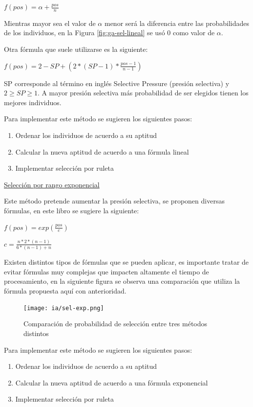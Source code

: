 \documentclass[11pt,fleqn]{book} %
\begin{document}
$f(pos) = \alpha + \frac{pos}{n}$

Mientras mayor sea el valor de $\alpha$ menor será la diferencia entre las probabilidades de los individuos, en la Figura \ref{fig:ga-sel-lineal} se usó 0 como valor de $\alpha$.

Otra fórmula que suele utilizarse es la siguiente:

$f(pos)=2-SP+\left ( 2*(SP-1)*\frac{pos-1}{n-1} \right )$

SP corresponde al término en inglés Selective Pressure (presión selectiva) y $2 \geq SP \geq 1$. A mayor presión selectiva más probabilidad de ser elegidos tienen los mejores individuos.

Para implementar este método se sugieren los siguientes pasos:
\begin{enumerate}
\item Ordenar los individuos de acuerdo a su aptitud
\item Calcular la nueva aptitud de acuerdo a una fórmula lineal
\item Implementar selección por ruleta
\end{enumerate}

\underline{Selección por rango exponencial}

Este método pretende aumentar la presión selectiva, se proponen diversas fórmulas, en este libro se sugiere la siguiente:

$f(pos)=exp(\frac{pos}{c})$

$c= \frac{n*2*(n-1)}{6*(n-1)+n} $

Existen distintos tipos de fórmulas que se pueden aplicar, es importante tratar de evitar fórmulas muy complejas que impacten altamente el tiempo de procesamiento, en la siguiente figura se observa una comparación que utiliza la fórmula propuesta aquí con anterioridad.

\begin{figure}[ht]
\centering\texttt{[image: ia/sel-exp.png]}
\caption{Comparación de probabilidad de selección entre tres métodos distintos}
\label{fig:comp_metodos} 
\end{figure}

Para implementar este método se sugieren los siguientes pasos:
\begin{enumerate}
\item Ordenar los individuos de acuerdo a su aptitud
\item Calcular la nueva aptitud de acuerdo a una fórmula exponencial
\item Implementar selección por ruleta
\end{enumerate}
\end{document}
